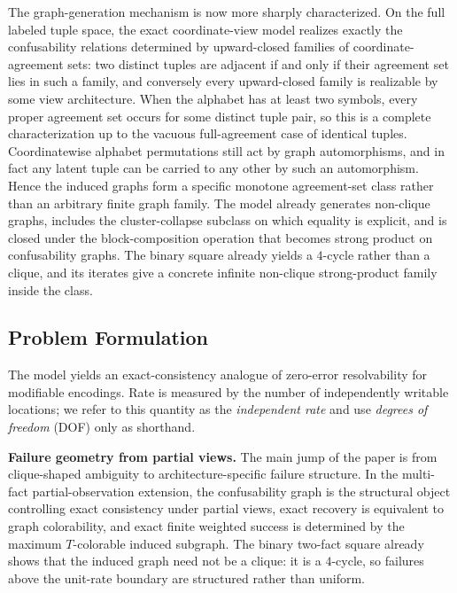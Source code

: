 The graph-generation mechanism is now more sharply characterized. On the full labeled tuple space, the exact coordinate-view model realizes exactly the confusability relations determined by upward-closed families of coordinate-agreement sets: two distinct tuples are adjacent if and only if their agreement set lies in such a family, and conversely every upward-closed family is realizable by some view architecture. When the alphabet has at least two symbols, every proper agreement set occurs for some distinct tuple pair, so this is a complete characterization up to the vacuous full-agreement case of identical tuples. Coordinatewise alphabet permutations still act by graph automorphisms, and in fact any latent tuple can be carried to any other by such an automorphism. Hence the induced graphs form a specific monotone agreement-set class rather than an arbitrary finite graph family. The model already generates non-clique graphs, includes the cluster-collapse subclass on which equality is explicit, and is closed under the block-composition operation that becomes strong product on confusability graphs. The binary square already yields a $4$-cycle rather than a clique, and its iterates give a concrete infinite non-clique strong-product family inside the class.

\subsection{Problem Formulation}\label{sec:encoding-problem}

The model yields an exact-consistency analogue of zero-error resolvability for modifiable encodings. Rate is measured by the number of independently writable locations; we refer to this quantity as the \emph{independent rate} and use \emph{degrees of freedom} (DOF) only as shorthand.

\noindent\textbf{Failure geometry from partial views.} The main jump of the paper is from clique-shaped ambiguity to architecture-specific failure structure. In the multi-fact partial-observation extension, the confusability graph is the structural object controlling exact consistency under partial views, exact recovery is equivalent to graph colorability, and exact finite weighted success is determined by the maximum $T$-colorable induced subgraph. The binary two-fact square already shows that the induced graph need not be a clique: it is a $4$-cycle, so failures above the unit-rate boundary are structured rather than uniform. 

